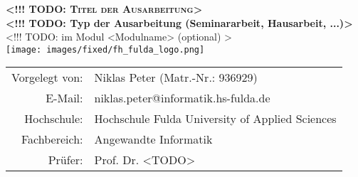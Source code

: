 
\thispagestyle{plain}
\begin{titlepage}

\begin{center}

\huge{\textbf{\textsc{<!!! TODO: Titel der Ausarbeitung>}}}\\[1.5ex]

\LARGE{\textbf{<!!! TODO: Typ der Ausarbeitung (Seminararbeit, Hausarbeit, ...)>}}\\[1.5ex]
\Large{<!!! TODO: im Modul <Modulname> (optional) >}\\[6ex]
\vfill
\texttt{[image: images/fixed/fh\_fulda\_logo.png]}\\[3ex]

\normalsize
 \vfill
\begin{tabular}{rl}
 Vorgelegt von: &  Niklas Peter (Matr.-Nr.: 936929) \\[0ex]
 E-Mail: & niklas.peter@informatik.hs-fulda.de \\
 Hochschule: & Hochschule Fulda \textendash{} University of Applied Sciences \\[0ex]
 Fachbereich: & Angewandte Informatik \\[0ex]
 Prüfer:         & Prof. Dr. <TODO> \\[0ex]
\end{tabular}
\end{center}		

\singlespacing
\small
\begin{center}
\npHandoverDate
\end{center}

\end{titlepage}



